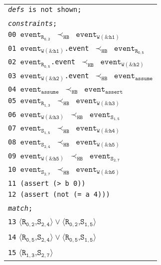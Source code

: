 \newsavebox{\boxSMTc}
\begin{lrbox}{\boxSMTc}
\normalsize
\begin{tabular}[t]{l}
\texttt{\textit{defs} is not shown;}\\
\\
\texttt{\textit{constraints};}\\
\texttt{00 $\mathtt{event_{R_{0,2}}}$ $\mathtt{\prec_\mathtt{HB}}$ $\mathtt{event_{W(\&h1)}}$}\\
\texttt{01 $\mathtt{event_{W(\&h1)}}$.event $\mathtt{\prec_\mathtt{HB}}$ $\mathtt{event_{R_{0,5}}}$}\\
\texttt{02 $\mathtt{event_{R_{0,5}}}$.event $\mathtt{\prec_\mathtt{HB}}$ $\mathtt{event_{W(\&h2)}}$}\\
\texttt{03 $\mathtt{event_{W(\&h2)}}$.event $\mathtt{\prec_\mathtt{HB}}$ $\mathtt{event_{assume}}$}\\
\texttt{04 $\mathtt{event_{assume}}$ $\mathtt{\prec_\mathtt{HB}}$ $\mathtt{event_{assert}}$}\\
\texttt{05 $\mathtt{event_{R_{1,3}}}$ $\mathtt{\prec_\mathtt{HB}}$ $\mathtt{event_{W(\&h3)}}$}\\
\texttt{06 $\mathtt{event_{W(\&h3)}}$ $\mathtt{\prec_\mathtt{HB}}$ $\mathtt{event_{S_{1,5}}}$}\\
\texttt{07 $\mathtt{event_{S_{1,5}}}$ $\mathtt{\prec_\mathtt{HB}}$ $\mathtt{event_{W(\&h4)}}$}\\
\texttt{08 $\mathtt{event_{S_{2,4}}}$ $\mathtt{\prec_\mathtt{HB}}$ $\mathtt{event_{W(\&h5)}}$}\\
\texttt{09 $\mathtt{event_{W(\&h5)}}$ $\mathtt{\prec_\mathtt{HB}}$ $\mathtt{event_{S_{2,7}}}$}\\
\texttt{10 $\mathtt{event_{S_{2,7}}}$ $\mathtt{\prec_\mathtt{HB}}$ $\mathtt{event_{W(\&h6)}}$}\\
\texttt{11 (assert (> b 0))}\\
\texttt{12 (assert (not (= a 4)))}\\
\\
\texttt{\textit{match};}\\
\texttt{13} $\langle\mathtt{R_{0,2}}$,$\mathtt{S_{2,4}}\rangle\vee\langle\mathtt{R_{0,2}}$,$\mathtt{S_{1,5}}\rangle$\\
\texttt{14} $\langle\mathtt{R_{0,5}}$,$\mathtt{S_{2,4}}\rangle\vee\langle\mathtt{R_{0,5}}$,$\mathtt{S_{1,5}}\rangle$\\
\texttt{15} $\langle\mathtt{R_{1,3}}$,$\mathtt{S_{2,7}}\rangle$\\

\end{tabular}
\end{lrbox}


